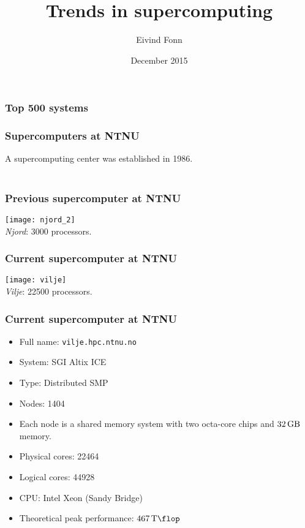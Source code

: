 

\title{Trends in supercomputing}
\author{Eivind Fonn}
\date{December 2015}
\maketitle

\begin{frame}
  \frametitle{Top 500 systems}
  \begin{center}
    
  \end{center}
\end{frame}

\begin{frame}
  \frametitle{Supercomputers at NTNU}
  A supercomputing center was established in 1986. \\~\\
  \begin{center}
    \scalebox{0.8}{
      
    }
  \end{center}
\end{frame}

\begin{frame}
  \frametitle{Previous supercomputer at NTNU}
  \begin{center}
    \texttt{[image: njord\_2]} \\
    \emph{Njord}: 3000 processors.
  \end{center}
\end{frame}

\begin{frame}
  \frametitle{Current supercomputer at NTNU}
  \begin{center}
    \texttt{[image: vilje]} \\
    \emph{Vilje}: 22500 processors.
  \end{center}
\end{frame}

\begin{frame}
  \frametitle{Current supercomputer at NTNU}
  \begin{itemize}
  \item Full name: \texttt{vilje.hpc.ntnu.no}
  \item System: SGI Altix ICE
  \item Type: Distributed SMP
  \item Nodes: 1404
  \item Each node is a shared memory system with two octa-core chips and
    $\SI{32}{\giga\byte}$ memory.
  \item Physical cores: 22464
  \item Logical cores: 44928
  \item CPU: Intel Xeon (Sandy Bridge)
  \item Theoretical peak performance: $\SI{467}{\tera\flop}$
  \end{itemize}
\end{frame}

